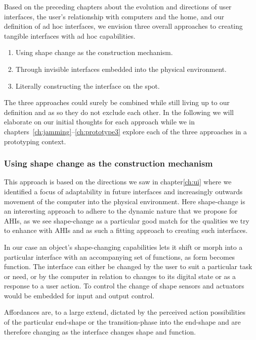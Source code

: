 Based on the preceding chapters about the evolution and directions of user interfaces, the user's relationship with computers and the home, and our definition of ad hoc interfaces, we envision three overall approaches to creating tangible interfaces with ad hoc capabilities.

\begin{enumerate}
	\item{Using shape change as the construction mechanism.}
	\item{Through invisible interfaces embedded into the physical environment.}
	\item{Literally constructing the interface on the spot.}
\end{enumerate}
The three approaches could surely be combined while still living up to our definition and as so they do not exclude each other.
In the following we will elaborate on our initial thoughts for each approach while we in chapters~\ref{ch:jamming}--\ref{ch:prototype3} explore each of the three approaches in a prototyping context.

\subsubsection{Using shape change as the construction mechanism}
This approach is based on the directions we saw in chapter\ref{ch:ui} where we identified a focus of adaptability in future interfaces and increasingly outwards movement of the computer into the physical environment.
Here shape-change is an interesting approach to adhere to the dynamic nature that we propose for AHIs, as we see shape-change as a particular good match for the qualities we try to enhance with AHIs and as such a fitting approach to creating such interfaces.

In our case an object's shape-changing capabilities lets it shift or morph into a particular interface with an accompanying set of functions, as form becomes function.
The interface can either be changed by the user to suit a particular task or need, or by the computer in relation to changes to its digital state or as a response to a user action.
To control the change of shape sensors and actuators would be embedded for input and output control.

Affordances are, to a large extend, dictated by the perceived action possibilities of the particular end-shape or the transition-phase into the end-shape and are therefore changing as the interface changes shape and function.

